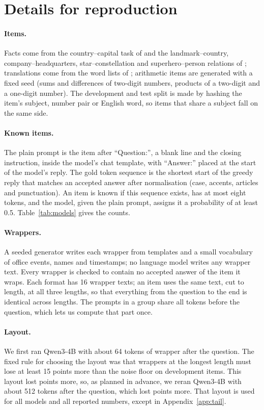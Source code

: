 \section{Details for reproduction}
\label{app:details}

\paragraph{Items.} Facts come from the country--capital task of \citet{todd2024function} and the landmark--country, company--headquarters, star--constellation and superhero--person relations of \citet{hernandez2024linearity}; translations come from the word lists of \citet{wendler2024llamas}; arithmetic items are generated with a fixed seed (sums and differences of two-digit numbers, products of a two-digit and a one-digit number). The development and test split is made by hashing the item's subject, number pair or English word, so items that share a subject fall on the same side.

\paragraph{Known items.} The plain prompt is the item after ``Question:'', a blank line and the closing instruction, inside the model's chat template, with ``Answer:'' placed at the start of the model's reply. The gold token sequence is the shortest start of the greedy reply that matches an accepted answer after normalisation (case, accents, articles and punctuation). An item is known if this sequence exists, has at most eight tokens, and the model, given the plain prompt, assigns it a probability of at least 0.5. Table~\ref{tab:models} gives the counts.

\paragraph{Wrappers.} A seeded generator writes each wrapper from templates and a small vocabulary of office events, names and timestamps; no language model writes any wrapper text. Every wrapper is checked to contain no accepted answer of the item it wraps. Each format has 16 wrapper texts; an item uses the same text, cut to length, at all three lengths, so that everything from the question to the end is identical across lengths. The prompts in a group share all tokens before the question, which lets us compute that part once.

\paragraph{Layout.} We first ran Qwen3-4B with about 64 tokens of wrapper after the question. The fixed rule for choosing the layout was that wrappers at the longest length must lose at least 15 points more than the noise floor on development items. This layout lost \GateShortDrop{} points more, so, as planned in advance, we reran Qwen3-4B with about 512 tokens after the question, which lost \GateLongDrop{} points more. That layout is used for all models and all reported numbers, except in Appendix~\ref{app:tail}.

